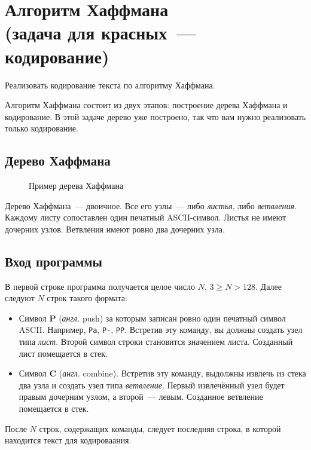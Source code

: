 ﻿\documentclass[a4paper,10pt]{article}
\begin{document}
\section*{Алгоритм Хаффмана\\
(задача для красных~--- кодирование)}

Реализовать кодирование текста по алгоритму Хаффмана.

Алгоритм Хаффмана состоит из двух этапов: построение дерева Хаффмана и кодирование.
В этой задаче дерево уже построено, так что вам нужно реализовать только кодирование.

\subsection*{Дерево Хаффмана}

\begin{figure}[htbp]
    \centering
    
    \caption{Пример дерева Хаффмана}
\end{figure}

Дерево Хаффмана~--- двоичное.
Все его узлы~--- либо \textit{листья}, либо \textit{ветвления}.
Каждому листу сопоставлен один печатный ASCII-символ.
Листья не имеют дочерних узлов.
Ветвления имеют ровно два дочерних узла.

\subsection*{Вход программы}

В первой строке программа получается целое число $N$, $3 \ge N > 128$.
Далее следуют $N$ строк такого формата:

\begin{itemize}
    \item Символ \textbf{P} (\textit{англ.} push) за которым записан ровно один печатный символ ASCII. Например, \texttt{Pa}, \texttt{P-}, \texttt{PP}.
    Встретив эту команду, вы должны создать узел типа \textit{лист}.
    Второй символ строки становится значением листа.
    Созданный лист помещается в стек.
    \item Символ \textbf{C} (\textit{англ.} combine).
    Встретив эту команду, выдолжны извлечь из стека два узла и создать узел типа \textit{ветвление}.
    Первый извлечённый узел будет правым дочерним узлом, а второй~--- левым.
    Созданное ветвление помещается в стек.
\end{itemize}

После $N$ строк, содержащих команды, следует последняя строка, в которой находится текст для кодироваания.
\end{document}

